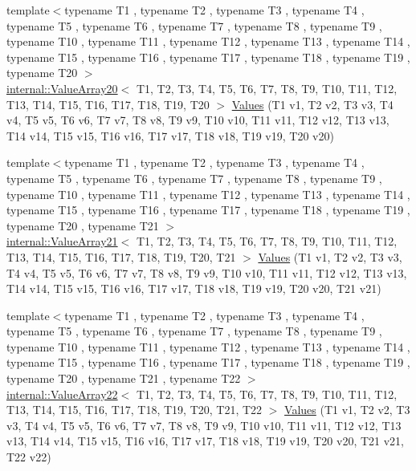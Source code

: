 \begin{DoxyCompactItemize}
\item 
{\footnotesize template$<$typename T1 , typename T2 , typename T3 , typename T4 , typename T5 , typename T6 , typename T7 , typename T8 , typename T9 , typename T10 , typename T11 , typename T12 , typename T13 , typename T14 , typename T15 , typename T16 , typename T17 , typename T18 , typename T19 , typename T20 $>$ }\\\hyperlink{classtesting_1_1internal_1_1ValueArray20}{internal\-::\-Value\-Array20}$<$ \-T1, \-T2, \*
\-T3, \-T4, \-T5, \-T6, \-T7, \-T8, \-T9, \*
\-T10, \-T11, \-T12, \-T13, \-T14, \-T15, \*
\-T16, \-T17, \-T18, \-T19, \-T20 $>$ \hyperlink{namespacetesting_aedd2f90dfb3c42dce713ba0b89cde96c}{\-Values} (\-T1 v1, \-T2 v2, \-T3 v3, \-T4 v4, \-T5 v5, \-T6 v6, \-T7 v7, \-T8 v8, \-T9 v9, \-T10 v10, \-T11 v11, \-T12 v12, \-T13 v13, \-T14 v14, \-T15 v15, \-T16 v16, \-T17 v17, \-T18 v18, \-T19 v19, \-T20 v20)
\item 
{\footnotesize template$<$typename T1 , typename T2 , typename T3 , typename T4 , typename T5 , typename T6 , typename T7 , typename T8 , typename T9 , typename T10 , typename T11 , typename T12 , typename T13 , typename T14 , typename T15 , typename T16 , typename T17 , typename T18 , typename T19 , typename T20 , typename T21 $>$ }\\\hyperlink{classtesting_1_1internal_1_1ValueArray21}{internal\-::\-Value\-Array21}$<$ \-T1, \-T2, \*
\-T3, \-T4, \-T5, \-T6, \-T7, \-T8, \-T9, \*
\-T10, \-T11, \-T12, \-T13, \-T14, \-T15, \*
\-T16, \-T17, \-T18, \-T19, \-T20, \-T21 $>$ \hyperlink{namespacetesting_a6f3b9661b48f2c663dbe5fcfb0720f5f}{\-Values} (\-T1 v1, \-T2 v2, \-T3 v3, \-T4 v4, \-T5 v5, \-T6 v6, \-T7 v7, \-T8 v8, \-T9 v9, \-T10 v10, \-T11 v11, \-T12 v12, \-T13 v13, \-T14 v14, \-T15 v15, \-T16 v16, \-T17 v17, \-T18 v18, \-T19 v19, \-T20 v20, \-T21 v21)
\item 
{\footnotesize template$<$typename T1 , typename T2 , typename T3 , typename T4 , typename T5 , typename T6 , typename T7 , typename T8 , typename T9 , typename T10 , typename T11 , typename T12 , typename T13 , typename T14 , typename T15 , typename T16 , typename T17 , typename T18 , typename T19 , typename T20 , typename T21 , typename T22 $>$ }\\\hyperlink{classtesting_1_1internal_1_1ValueArray22}{internal\-::\-Value\-Array22}$<$ \-T1, \-T2, \*
\-T3, \-T4, \-T5, \-T6, \-T7, \-T8, \-T9, \*
\-T10, \-T11, \-T12, \-T13, \-T14, \-T15, \*
\-T16, \-T17, \-T18, \-T19, \-T20, \-T21, \*
\-T22 $>$ \hyperlink{namespacetesting_aadfff0d803156b98ff1ffa5f1d95c350}{\-Values} (\-T1 v1, \-T2 v2, \-T3 v3, \-T4 v4, \-T5 v5, \-T6 v6, \-T7 v7, \-T8 v8, \-T9 v9, \-T10 v10, \-T11 v11, \-T12 v12, \-T13 v13, \-T14 v14, \-T15 v15, \-T16 v16, \-T17 v17, \-T18 v18, \-T19 v19, \-T20 v20, \-T21 v21, \-T22 v22)

\end{DoxyCompactItemize}
